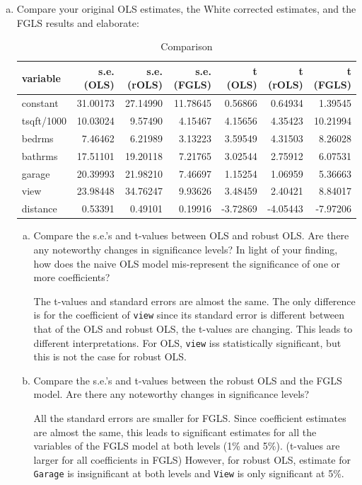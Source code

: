 \documentclass[11pt,reqno]{amsart}\usepackage[]{graphicx}\usepackage[]{color}
\newcommand{\ksp}{\vspace{0.1in}}   %
\begin{document}
\begin{enumerate}[(a)]
\item Compare your original OLS estimates, the White corrected estimates, and the FGLS results and elaborate:

\begin{table}[ht]
\centering
\caption{Comparison} 
\begin{tabular}{lrrrrrr}
  \hline
variable & s.e. (OLS) & s.e. (rOLS) & s.e. (FGLS) & t (OLS) & t (rOLS) & t (FGLS) \\ 
  \hline
constant & 31.00173 & 27.14990 & 11.78645 & 0.56866 & 0.64934 & 1.39545 \\ 
  tsqft/1000 & 10.03024 & 9.57490 & 4.15467 & 4.15656 & 4.35423 & 10.21994 \\ 
  bedrms & 7.46462 & 6.21989 & 3.13223 & 3.59549 & 4.31503 & 8.26028 \\ 
  bathrms & 17.51101 & 19.20118 & 7.21765 & 3.02544 & 2.75912 & 6.07531 \\ 
  garage & 20.39993 & 21.98210 & 7.46697 & 1.15254 & 1.06959 & 5.36663 \\ 
  view & 23.98448 & 34.76247 & 9.93626 & 3.48459 & 2.40421 & 8.84017 \\ 
  distance & 0.53391 & 0.49101 & 0.19916 & -3.72869 & -4.05443 & -7.97206 \\ 
   \hline
\end{tabular}
\end{table}


\begin{enumerate}[(a)]
\item Compare the s.e.’s and t-values between OLS and robust OLS. Are there any noteworthy changes in significance levels? In light of your finding, how does the naive OLS model mis-represent the significance of one or more coefficients?

\ksp
The t-values and standard errors are almost the same. The only difference is for the coefficient of \texttt{view} since its standard error is different between that of the OLS and robust OLS, the t-values are changing. This leads to different interpretations. For OLS, \texttt{view} iss statistically significant, but this is not the case for robust OLS.

\ksp
\item Compare the s.e.’s and t-values between the robust OLS and the FGLS model. Are there any noteworthy changes in significance levels?

\ksp
All the standard errors are smaller for FGLS. Since coefficient estimates are almost the same, this leads to significant estimates for all the variables of the FGLS model at both levels (1\% and 5\%). (t-values are larger for all coefficients in FGLS) However, for robust OLS, estimate for \texttt{Garage} is insignificant at both levels and \texttt{View} is only significant at 5\%.


\end{enumerate}
\end{enumerate}
\end{document}
